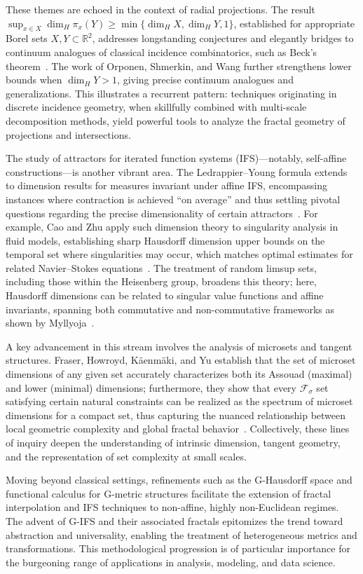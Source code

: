 \documentclass[sigconf]{acmart}
\begin{document}
These themes are echoed in the context of radial projections. The result $\sup_{x \in X} \dim_H \pi_x(Y) \geq \min\{ \dim_H X, \dim_H Y, 1 \}$, established for appropriate Borel sets $X, Y \subset \mathbb{R}^2$, addresses longstanding conjectures and elegantly bridges to continuum analogues of classical incidence combinatorics, such as Beck's theorem~\cite{ref92}. The work of Orponen, Shmerkin, and Wang further strengthens lower bounds when $\dim_H Y > 1$, giving precise continuum analogues and generalizations. This illustrates a recurrent pattern: techniques originating in discrete incidence geometry, when skillfully combined with multi-scale decomposition methods, yield powerful tools to analyze the fractal geometry of projections and intersections.

The study of attractors for iterated function systems (IFS)—notably, self-affine constructions—is another vibrant area. The Ledrappier–Young formula extends to dimension results for measures invariant under affine IFS, encompassing instances where contraction is achieved ``on average'' and thus settling pivotal questions regarding the precise dimensionality of certain attractors~\cite{ref70}. For example, Cao and Zhu apply such dimension theory to singularity analysis in fluid models, establishing sharp Hausdorff dimension upper bounds on the temporal set where singularities may occur, which matches optimal estimates for related Navier–Stokes equations~\cite{ref70}. The treatment of random limsup sets, including those within the Heisenberg group, broadens this theory; here, Hausdorff dimensions can be related to singular value functions and affine invariants, spanning both commutative and non-commutative frameworks as shown by Myllyoja~\cite{ref73}.

A key advancement in this stream involves the analysis of microsets and tangent structures. Fraser, Howroyd, Käenmäki, and Yu establish that the set of microset dimensions of any given set accurately characterizes both its Assouad (maximal) and lower (minimal) dimensions; furthermore, they show that every $\mathcal{F}_\sigma$ set satisfying certain natural constraints can be realized as the spectrum of microset dimensions for a compact set, thus capturing the nuanced relationship between local geometric complexity and global fractal behavior~\cite{ref72}. Collectively, these lines of inquiry deepen the understanding of intrinsic dimension, tangent geometry, and the representation of set complexity at small scales.

Moving beyond classical settings, refinements such as the G-Hausdorff space and functional calculus for G-metric structures facilitate the extension of fractal interpolation and IFS techniques to non-affine, highly non-Euclidean regimes. The advent of G-IFS and their associated fractals epitomizes the trend toward abstraction and universality, enabling the treatment of heterogeneous metrics and transformations. This methodological progression is of particular importance for the burgeoning range of applications in analysis, modeling, and data science.
\end{document}
